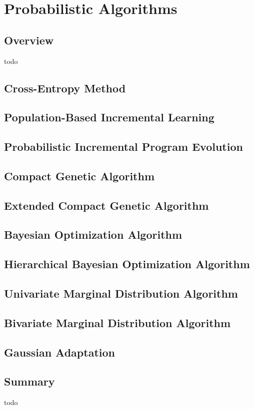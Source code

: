 


\chapter{Probabilistic Algorithms}
\label{ch:probabilistic}

\section{Overview}
todo

\section{Cross-Entropy Method}
\section{Population-Based Incremental Learning}
\section{Probabilistic Incremental Program Evolution}
\section{Compact Genetic Algorithm}
\section{Extended Compact Genetic Algorithm}
\section{Bayesian Optimization Algorithm}
\section{Hierarchical Bayesian Optimization Algorithm}
\section{Univariate Marginal Distribution Algorithm}
\section{Bivariate Marginal Distribution Algorithm}
\section{Gaussian Adaptation}

\section{Summary}
todo
